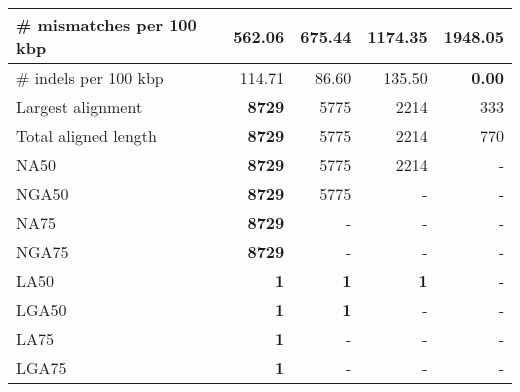 \documentclass[12pt,a4paper]{article}
\begin{document}
\begin{table}[ht]
\begin{center}
\begin{tabular}{|l*{4}{|r}|}
\# mismatches per 100 kbp & {\bf 562.06} & 675.44 & 1174.35 & 1948.05 \\ \hline
\# indels per 100 kbp & 114.71 & 86.60 & 135.50 & {\bf 0.00} \\ \hline
Largest alignment & {\bf 8729} & 5775 & 2214 & 333 \\ \hline
Total aligned length & {\bf 8729} & 5775 & 2214 & 770 \\ \hline
NA50 & {\bf 8729} & 5775 & 2214 & - \\ \hline
NGA50 & {\bf 8729} & 5775 & - & - \\ \hline
NA75 & {\bf 8729} & - & - & - \\ \hline
NGA75 & {\bf 8729} & - & - & - \\ \hline
LA50 & {\bf 1} & {\bf 1} & {\bf 1} & - \\ \hline
LGA50 & {\bf 1} & {\bf 1} & - & - \\ \hline
LA75 & {\bf 1} & - & - & - \\ \hline
LGA75 & {\bf 1} & - & - & - \\ \hline
\end{tabular}
\end{center}
\end{table}
\end{document}
